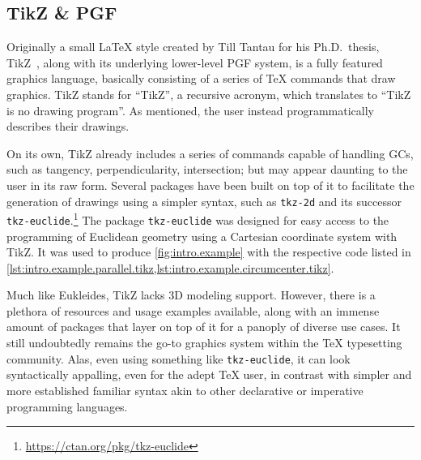 \subsection{TikZ \& PGF}%
\label{sec:related.constraints.tikz}

Originally a small \LaTeX{} style created by Till Tantau for his Ph.D.\ thesis,
\ac{TikZ}~\cite{Tantau:2021:TikZ}, along with its underlying lower-level
\ac{PGF} system, is a fully featured graphics language, basically consisting of
a series of \TeX{} commands that draw graphics.  \Ac{TikZ} stands for
``\acl{TikZ}\label{acro:TikZ}'', a recursive acronym, which translates to ``TikZ
is no drawing program''.  As mentioned, the user instead programmatically
describes their drawings.

On its own, \ac{TikZ} already includes a series of commands capable of handling
\acp{GC}, such as tangency, perpendicularity, intersection; but may appear
daunting to the user in its raw form.  Several packages have been built on top
of it to facilitate the generation of drawings using a simpler syntax, such as
\texttt{tkz-2d} and its successor
\texttt{tkz-euclide}.\footnote{\url{https://ctan.org/pkg/tkz-euclide}}  The
package \texttt{tkz-euclide} was designed for easy access to the programming of
Euclidean geometry using a Cartesian coordinate system with \ac{TikZ}.  It was
used to produce \cref{fig:intro.example} with the respective code listed in
\cref{lst:intro.example.parallel.tikz,lst:intro.example.circumcenter.tikz}.

Much like Eukleides, \ac{TikZ} lacks 3D modeling support.  However, there is a
plethora of resources and usage examples available, along with an immense amount
of packages that layer on top of it for a panoply of diverse use cases.  It
still undoubtedly remains the go-to graphics system within the \TeX{}
typesetting community.  Alas, even using something like \texttt{tkz-euclide}, it
can look syntactically appalling, even for the adept \TeX{} user, in contrast
with simpler and more established familiar syntax akin to other declarative or
imperative programming languages.
